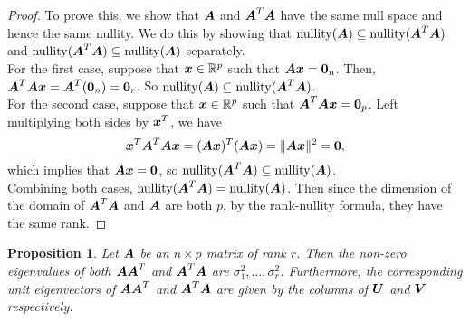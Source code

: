 \documentclass[12pt]{article}
\newtheorem{prop}{Proposition}[section]
\DeclareMathOperator{\nul}{nullity}
\begin{document}
	\begin{proof}
		To prove this, we show that $\boldsymbol{A}$ and $\boldsymbol{A}^T\boldsymbol{A}$ have the same null space and hence the same nullity. We do this by showing that $\nul(\bmA)\subseteq\nul(\bmA^T\bmA)$ and $\nul(\bmA^T\bmA)\subseteq\nul(\bmA)$ separately.\\
		
		For the first case, suppose that $\bmx\in\RR^p$ such that $\boldsymbol{A}\boldsymbol{x}=\textbf{0}_n$. Then, $\boldsymbol{A}^T\boldsymbol{A}\boldsymbol{x}=\boldsymbol{A}^T(\textbf{0}_n)=\textbf{0}_r$. So $\nul(\bmA)\subseteq\nul(\bmA^T\bmA)$.\\
		
		For the second case, suppose that $\bmx\in\RR^p$ such that $\boldsymbol{A}^T\boldsymbol{A}\boldsymbol{x}=\textbf{0}_p$. Left multiplying both sides by $\boldsymbol{x}^T$, we have
		\begin{equation}
			\boldsymbol{x}^T\boldsymbol{A}^T\boldsymbol{A}\boldsymbol{x}=(\boldsymbol{A}\boldsymbol{x})^T(\boldsymbol{A}\boldsymbol{x})=\|\boldsymbol{A}\boldsymbol{x}\|^2=\textbf{0},
		\end{equation}
		which implies that $\boldsymbol{A}\boldsymbol{x}=\textbf{0}$, so $\nul(\bmA^T\bmA)\subseteq\nul(\bmA)$.\\

		Combining both cases, $\nul(\bmA^T\bmA)=\nul(\bmA)$. Then since the dimension of the domain of $\boldsymbol{A}^T\boldsymbol{A}$ and $\boldsymbol{A}$ are both $p$, by the rank-nullity formula, they have the same rank.
	\end{proof}
	\pagebreak
	\begin{prop}\label{prop1}
		Let $\boldsymbol{A}$ be an $n\times p$ matrix of rank $r$. Then the non-zero eigenvalues of both $\boldsymbol{A}\boldsymbol{A}^T$ and $\boldsymbol{A}^T\boldsymbol{A}$ are $\sigma_1^2,\ldots,\sigma_r^2$.
		Furthermore, the corresponding unit eigenvectors of $\boldsymbol{A}\boldsymbol{A}^T$ and $\boldsymbol{A}^T\boldsymbol{A}$ are given by the columns of $\boldsymbol{U}$ and $\boldsymbol{V}$ respectively.
	\end{prop}
	
\end{document}
